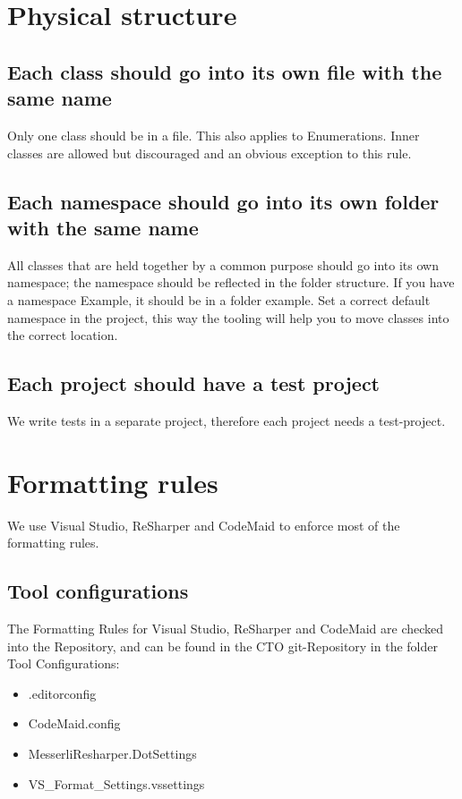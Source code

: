 \documentclass[11pt,a4paper]{article}
\begin{document}
\section{Physical structure}

\subsection{Each class should go into its own file with the same name}

Only one class should be in a file. This also applies to Enumerations.
Inner classes are allowed but discouraged and an obvious exception to this rule. 

\subsection{Each namespace should go into its own folder with the same name}

All classes that are held together by a common purpose should go into its own namespace; the namespace should be reflected in the folder structure. If you have a namespace Example, it should be in a folder example.
Set a correct default namespace in the project, this way the tooling will help you to move classes into the correct location.

\subsection{Each project should have a test project}

We write tests in a separate project, therefore each project needs a test-project.

\section{Formatting rules}

We use Visual Studio, ReSharper and CodeMaid to enforce most of the formatting rules. 

\subsection{Tool configurations}
The Formatting Rules for Visual Studio, ReSharper and CodeMaid are checked into the Repository, and can be found in the CTO git-Repository in the folder Tool Configurations:
\begin{itemize}[itemsep=0pt]
  \item .editorconfig
  \item CodeMaid.config
  \item MesserliResharper.DotSettings
  \item VS\_Format\_Settings.vssettings
\end{itemize}
\end{document}

